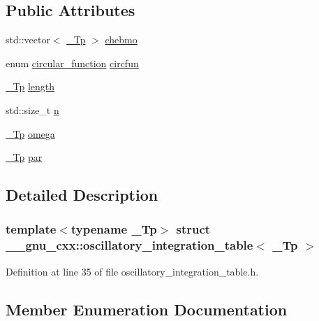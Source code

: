 \subsection*{Public Attributes}
\begin{DoxyCompactItemize}
\item 
std\+::vector$<$ \hyperlink{namespace____gnu__cxx_a3b19a9c800ca194374ef9172290f7d79}{\+\_\+\+Tp} $>$ \hyperlink{struct____gnu__cxx_1_1oscillatory__integration__table_a29c973330c5f164962da57a528ccab55}{chebmo}
\item 
enum \hyperlink{struct____gnu__cxx_1_1oscillatory__integration__table_aea06e472bb9ff6c535cfdc6a84b14e96}{circular\+\_\+function} \hyperlink{struct____gnu__cxx_1_1oscillatory__integration__table_a21f86f96ca3654c18fa987f15bc14eaf}{circfun}
\item 
\hyperlink{namespace____gnu__cxx_a3b19a9c800ca194374ef9172290f7d79}{\+\_\+\+Tp} \hyperlink{struct____gnu__cxx_1_1oscillatory__integration__table_ad8654aa233b4878af8d9a99ed61db488}{length}
\item 
std\+::size\+\_\+t \hyperlink{struct____gnu__cxx_1_1oscillatory__integration__table_a7afb6e15c7cf51c48ed89fc2d8450179}{n}
\item 
\hyperlink{namespace____gnu__cxx_a3b19a9c800ca194374ef9172290f7d79}{\+\_\+\+Tp} \hyperlink{struct____gnu__cxx_1_1oscillatory__integration__table_a722a28c43e85cce33bbe6337e6a5c9eb}{omega}
\item 
\hyperlink{namespace____gnu__cxx_a3b19a9c800ca194374ef9172290f7d79}{\+\_\+\+Tp} \hyperlink{struct____gnu__cxx_1_1oscillatory__integration__table_ae98255b8cccea27dde0047c45cfc2ac6}{par}
\end{DoxyCompactItemize}


\subsection{Detailed Description}
\subsubsection*{template$<$typename \+\_\+\+Tp$>$\newline
struct \+\_\+\+\_\+gnu\+\_\+cxx\+::oscillatory\+\_\+integration\+\_\+table$<$ \+\_\+\+Tp $>$}



Definition at line 35 of file oscillatory\+\_\+integration\+\_\+table.\+h.



\subsection{Member Enumeration Documentation}
\mbox{\label{struct____gnu__cxx_1_1oscillatory__integration__table_aea06e472bb9ff6c535cfdc6a84b14e96}} 
